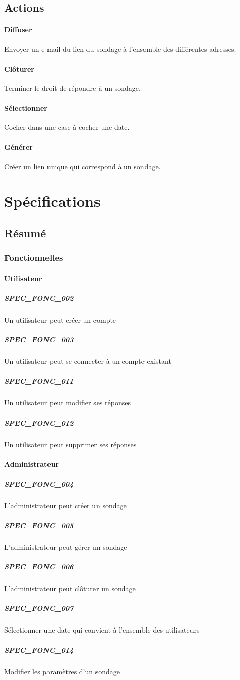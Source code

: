 \documentclass[titlepage]{report}
\begin{document}
\subsection{Actions}
\paragraph{Diffuser} Envoyer un e-mail du lien du sondage à l’ensemble des différentes adresses.
\paragraph{Clôturer} Terminer le droit de répondre à un sondage.
\paragraph{Sélectionner} Cocher dans une case à cocher une date.
\paragraph{Générer} Créer un lien unique qui correspond à un sondage.

\section{Spécifications}

\subsection{Résumé}
\subsubsection{Fonctionnelles}

\paragraph{Utilisateur}
\subparagraph{SPEC\_FONC\_002} Un utilisateur peut créer un compte
\subparagraph{SPEC\_FONC\_003} Un utilisateur peut se connecter à un compte existant
\subparagraph{SPEC\_FONC\_011} Un utilisateur peut modifier ses réponses
\subparagraph{SPEC\_FONC\_012} Un utilisateur peut supprimer ses réponses

\paragraph{Administrateur}
\subparagraph{SPEC\_FONC\_004} L’administrateur peut créer un sondage
\subparagraph{SPEC\_FONC\_005} L’administrateur peut gérer un sondage
\subparagraph{SPEC\_FONC\_006} L’administrateur peut clôturer un sondage
\subparagraph{SPEC\_FONC\_007} Sélectionner une date qui convient à l’ensemble des utilisateurs
\subparagraph{SPEC\_FONC\_014} Modifier les paramètres d’un sondage
\end{document}
